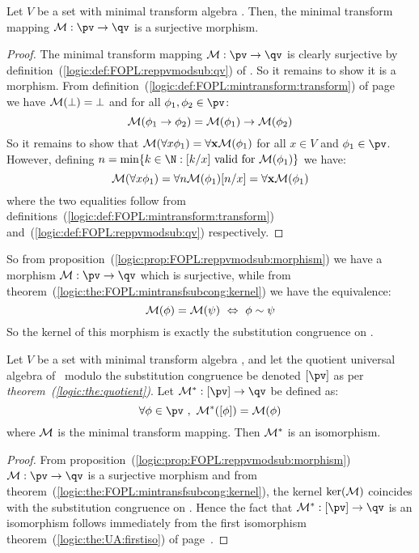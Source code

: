 \begin{prop}\label{logic:prop:FOPL:reppvmodsub:morphism}
Let $V$ be a set with minimal transform algebra \qv. Then, the
minimal transform mapping ${\cal M}:\pv\to\qv$ is a surjective
morphism.
\end{prop}
\begin{proof}
The minimal transform mapping ${\cal M}:\pv\to\qv$ is clearly
surjective by definition~(\ref{logic:def:FOPL:reppvmodsub:qv}) of
\qv. So it remains to show it is a morphism. From
definition~(\ref{logic:def:FOPL:mintransform:transform}) of
page~\pageref{logic:def:FOPL:mintransform:transform} we have ${\cal
M}(\bot)=\bot$ and for all $\phi_{1},\phi_{2}\in\pv$:
    \[
     {\cal M}(\phi_{1}\to\phi_{2})={\cal M}(\phi_{1})
     \to{\cal M}(\phi_{2})
     \]
So it remains to show that ${\cal M}(\forall x\phi_{1})=\forall{\bf
x}{\cal M}(\phi_{1})$ for all $x\in V$ and $\phi_{1}\in\pv$.
However, defining $n=\min\{k\in\N:\mbox{$[k/x]$ valid for ${\cal
M}(\phi_{1})$}\}$ we have:
    \[
    {\cal M}(\forall x\phi_{1})=\forall n{\cal
    M}(\phi_{1})[n/x]=\forall{\bf x}{\cal M}(\phi_{1})
    \]
where the two equalities follow from
definitions~(\ref{logic:def:FOPL:mintransform:transform})
and~(\ref{logic:def:FOPL:reppvmodsub:qv}) respectively.
\end{proof}

So from proposition~(\ref{logic:prop:FOPL:reppvmodsub:morphism}) we
have a morphism ${\cal M}:\pv\to\qv$ which is surjective, while from
theorem~(\ref{logic:the:FOPL:mintransfsubcong:kernel}) we have the
equivalence:
     \[
     {\cal M}(\phi)={\cal M}(\psi)\ \Leftrightarrow\ \phi\sim\psi
     \]
So the kernel of this morphism is exactly the substitution
congruence on \pv.

\begin{theorem}\label{logic:the:FOPL:reppvmodsub:isomorphism}
Let $V$ be a set with minimal transform algebra \qv, and let the
quotient universal algebra of \pv\ modulo the substitution
congruence be denoted  $[\pv]$ as per {\em
theorem~(\ref{logic:the:quotient})}. Let ${\cal M}^{*}:[\pv]\to\qv$
be defined as:
    \[
    \forall\phi\in\pv\ ,\ {\cal M}^{*}([\phi])={\cal
    M}(\phi)
    \]
where ${\cal M}$ is the minimal transform mapping. Then ${\cal
M}^{*}$ is an isomorphism.
\end{theorem}
\begin{proof}
From proposition~(\ref{logic:prop:FOPL:reppvmodsub:morphism}) ${\cal
M}:\pv\to\qv$ is a surjective morphism and from
theorem~(\ref{logic:the:FOPL:mintransfsubcong:kernel}), the kernel
$\ker({\cal M})$ coincides with the substitution congruence on \pv.
Hence the fact that ${\cal M}^{*}:[\pv]\to\qv$ is an isomorphism
follows immediately from the first isomorphism
theorem~(\ref{logic:the:UA:firstiso}) of
page~\pageref{logic:the:UA:firstiso}.
\end{proof}

